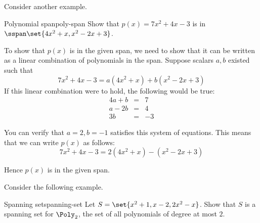 Consider another example. 

\begin{example}{Polynomial span}{poly-span}
Show that $p(x) = 7x^2 + 4x - 3$ is in $\sspan\set{4x^2 + x, x^2 -2x + 3 }$. 
\end{example}

\begin{solution}
To show that $p(x)$ is in the given span, we need to show that it can be written as a linear combination of polynomials in the span. Suppose scalars $a, b$ existed such that 
\[
7x^2 +4x - 3= a(4x^2+x) + b (x^2-2x+3) 
\]
If this linear combination were to hold, the following would be true:
\begin{eqnarray*}
4a + b &=& 7 \\
a - 2b &=& 4 \\
3b &=& -3 
\end{eqnarray*}

You can verify that $a = 2, b = -1$ satisfies this system of equations. This means that we can write $p(x)$ as follows:
\[
 7x^2 +4x-3= 2(4x^2+x)  - (x^2-2x+3) 
\]

Hence $p(x)$ is in the given span.
\end{solution}

Consider the following example.

\begin{example}{Spanning set}{spanning-set}
Let $S = \set{x^2 + 1, x-2, 2x^2 - x }$. Show that $S$ is a spanning set for $\Poly_2$, the set of all polynomials of degree at most $2$. 
\end{example}

